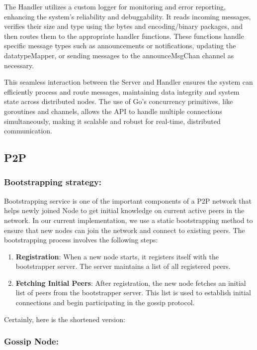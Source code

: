 The Handler utilizes a custom logger for monitoring and error reporting, enhancing the system's reliability and debuggability. It reads incoming messages, verifies their size and type using the bytes and encoding/binary packages, and then routes them to the appropriate handler functions. These functions handle specific message types such as announcements or notifications, updating the datatypeMapper, or sending messages to the announceMsgChan channel as necessary.

This seamless interaction between the Server and Handler ensures the system can efficiently process and route messages, maintaining data integrity and system state across distributed nodes. The use of Go's concurrency primitives, like goroutines and channels, allows the API to handle multiple connections simultaneously, making it scalable and robust for real-time, distributed communication.

\subsection{P2P}

\subsubsection{Bootstrapping strategy:}

Bootstrapping service is one of the important components of a P2P network that helps newly joined Node to get initial knowledge on current active peers in the network. 
In our current implementation, we use a static bootstrapping method to ensure that new nodes can join the network and connect to existing peers. The bootstrapping process involves the following steps:

\begin{enumerate}
    \item \textbf{Registration}: When a new node starts, it registers itself with the bootstrapper server. The server maintains a list of all registered peers.
    \item \textbf{Fetching Initial Peers}: After registration, the new node fetches an initial list of peers from the bootstrapper server. This list is used to establish initial connections and begin participating in the gossip protocol.
\end{enumerate}


Certainly, here is the shortened version:

\subsubsection{Gossip Node:}

